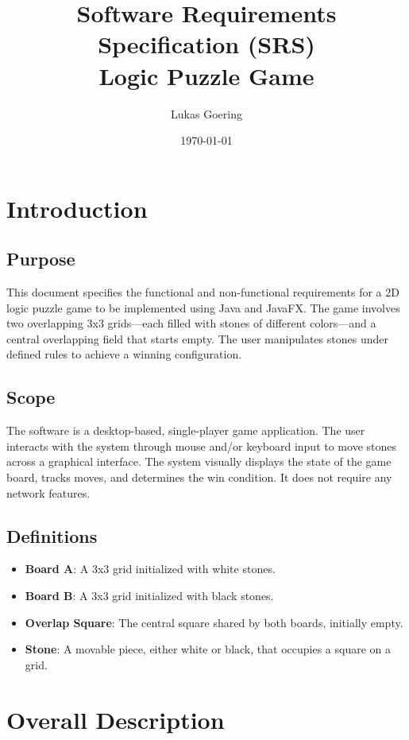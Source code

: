 \documentclass[11.5pt, oneside]{scrartcl}
\title{Software Requirements Specification (SRS)\\\large Logic Puzzle Game}
\author{Lukas Goering}
\date{\today}
\begin{document}
	
	\maketitle
	
	\section{Introduction}
	
	\subsection{Purpose}
	This document specifies the functional and non-functional requirements for a 2D logic puzzle game to be implemented using Java and JavaFX. The game involves two overlapping 3x3 grids—each filled with stones of different colors—and a central overlapping field that starts empty. The user manipulates stones under defined rules to achieve a winning configuration.
	
	\subsection{Scope}
	The software is a desktop-based, single-player game application. The user interacts with the system through mouse and/or keyboard input to move stones across a graphical interface. The system visually displays the state of the game board, tracks moves, and determines the win condition. It does not require any network features.
	
	\subsection{Definitions}
	\begin{itemize}[noitemsep]
		\item \textbf{Board A}: A 3x3 grid initialized with white stones.
		\item \textbf{Board B}: A 3x3 grid initialized with black stones.
		\item \textbf{Overlap Square}: The central square shared by both boards, initially empty.
		\item \textbf{Stone}: A movable piece, either white or black, that occupies a square on a grid.
	\end{itemize}
	
	\section{Overall Description}
	
\end{document}
